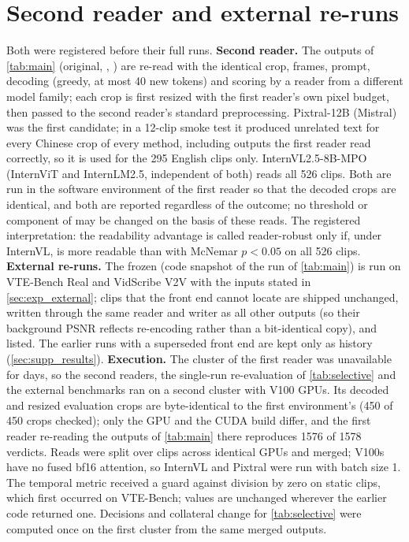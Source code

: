 \section{Second reader and external re-runs}
\label{sec:supp_prereg_reader}
Both were registered before their full runs. \textbf{Second reader.} The outputs of \cref{tab:main} (original, \steer, \method) are re-read with the identical crop, frames, prompt, decoding (greedy, at most 40 new tokens) and scoring by a reader from a different model family; each crop is first resized with the first reader's own pixel budget, then passed to the second reader's standard preprocessing. Pixtral-12B (Mistral) was the first candidate; in a 12-clip smoke test it produced unrelated text for every Chinese crop of every method, including outputs the first reader read correctly, so it is used for the 295 English clips only. InternVL2.5-8B-MPO (InternViT and InternLM2.5, independent of both) reads all 526 clips. Both are run in the software environment of the first reader so that the decoded crops are identical, and both are reported regardless of the outcome; no threshold or component of \method may be changed on the basis of these reads. The registered interpretation: the readability advantage is called reader-robust only if, under InternVL, \method is more readable than \steer with McNemar $p<0.05$ on all 526 clips. \textbf{External re-runs.} The frozen \method (code snapshot of the run of \cref{tab:main}) is run on VTE-Bench Real and VidScribe V2V with the inputs stated in \cref{sec:exp_external}; clips that the front end cannot locate are shipped unchanged, written through the same reader and writer as all other outputs (so their background PSNR reflects re-encoding rather than a bit-identical copy), and listed. The earlier runs with a superseded front end are kept only as history (\cref{sec:supp_results}). \textbf{Execution.} The cluster of the first reader was unavailable for days, so the second readers, the single-run re-evaluation of \cref{tab:selective} and the external benchmarks ran on a second cluster with V100 GPUs. Its decoded and resized evaluation crops are byte-identical to the first environment's (450 of 450 crops checked); only the GPU and the CUDA build differ, and the first reader re-reading the outputs of \cref{tab:main} there reproduces 1576 of 1578 verdicts. Reads were split over clips across identical GPUs and merged; V100s have no fused bf16 attention, so InternVL and Pixtral were run with batch size 1. The temporal metric received a guard against division by zero on static clips, which first occurred on VTE-Bench; values are unchanged wherever the earlier code returned one. Decisions and collateral change for \cref{tab:selective} were computed once on the first cluster from the same merged outputs.

